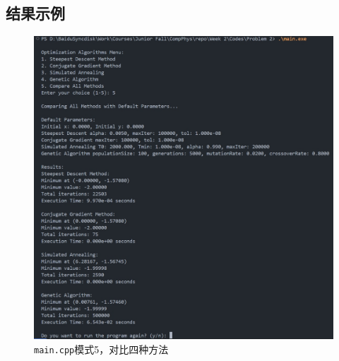 \subsection{结果示例}
\begin{figure}[H]
    \centering
    \includegraphics[width=1.0\textwidth]{Figs/2_all.png}
    \caption{\texttt{main.cpp}模式5，对比四种方法}
    \label{fig:2_cpp_all}
\end{figure}

